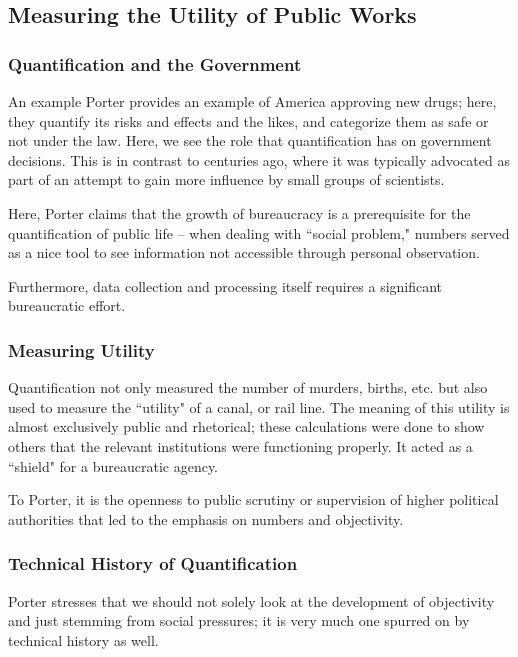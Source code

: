 \documentclass[openany]{book}
\begin{document}
\subsection{Measuring the Utility of Public Works}
\subsubsection{Quantification and the Government}
An example Porter provides an example of America approving new drugs; here, they quantify its risks and effects and the likes, and categorize them as safe or not under the law. Here, we see the role that quantification has on government decisions. This is in contrast to centuries ago, where it was typically advocated as part of an attempt to gain more influence by small groups of scientists.

Here, Porter claims that the growth of bureaucracy is a prerequisite for the quantification of public life -- when dealing with ``social problem," numbers served as a nice tool to see information not accessible through personal observation.

Furthermore, data collection and processing itself requires a significant bureaucratic effort. 

\subsubsection{Measuring Utility}
Quantification not only measured the number of murders, births, etc. but also used to measure the ``utility" of a canal, or rail line. The meaning of this utility is almost exclusively public and rhetorical; these calculations were done to show others that the relevant institutions were functioning properly. It acted as a ``shield" for a bureaucratic agency.

To Porter, it is the openness to public scrutiny or supervision of higher political authorities that led to the emphasis on numbers and objectivity.

\subsubsection{Technical History of Quantification}
\begin{warn}
	Porter stresses that we should not solely look at the development of objectivity and just stemming from social pressures; it is very much one spurred on by technical history as well.
\end{warn}
\end{document}
